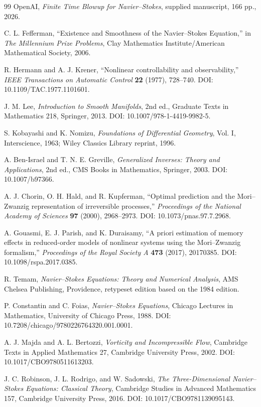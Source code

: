 \documentclass[12pt]{article}
\begin{document}
\begin{thebibliography}{99}
OpenAI, \emph{Finite Time Blowup for Navier--Stokes}, supplied manuscript, 166 pp., 2026.

C. L. Fefferman, ``Existence and Smoothness of the Navier--Stokes Equation,'' in \emph{The Millennium Prize Problems}, Clay Mathematics Institute/American Mathematical Society, 2006.

R. Hermann and A. J. Krener, ``Nonlinear controllability and observability,'' \emph{IEEE Transactions on Automatic Control} \textbf{22} (1977), 728--740. DOI: 10.1109/TAC.1977.1101601.

J. M. Lee, \emph{Introduction to Smooth Manifolds}, 2nd ed., Graduate Texts in Mathematics 218, Springer, 2013. DOI: 10.1007/978-1-4419-9982-5.

S. Kobayashi and K. Nomizu, \emph{Foundations of Differential Geometry}, Vol. I, Interscience, 1963; Wiley Classics Library reprint, 1996.

A. Ben-Israel and T. N. E. Greville, \emph{Generalized Inverses: Theory and Applications}, 2nd ed., CMS Books in Mathematics, Springer, 2003. DOI: 10.1007/b97366.

A. J. Chorin, O. H. Hald, and R. Kupferman, ``Optimal prediction and the Mori--Zwanzig representation of irreversible processes,'' \emph{Proceedings of the National Academy of Sciences} \textbf{97} (2000), 2968--2973. DOI: 10.1073/pnas.97.7.2968.

A. Gouasmi, E. J. Parish, and K. Duraisamy, ``A priori estimation of memory effects in reduced-order models of nonlinear systems using the Mori--Zwanzig formalism,'' \emph{Proceedings of the Royal Society A} \textbf{473} (2017), 20170385. DOI: 10.1098/rspa.2017.0385.

R. Temam, \emph{Navier--Stokes Equations: Theory and Numerical Analysis}, AMS Chelsea Publishing, Providence, retypeset edition based on the 1984 edition.

P. Constantin and C. Foias, \emph{Navier--Stokes Equations}, Chicago Lectures in Mathematics, University of Chicago Press, 1988. DOI: 10.7208/chicago/9780226764320.001.0001.

A. J. Majda and A. L. Bertozzi, \emph{Vorticity and Incompressible Flow}, Cambridge Texts in Applied Mathematics 27, Cambridge University Press, 2002. DOI: 10.1017/CBO9780511613203.

J. C. Robinson, J. L. Rodrigo, and W. Sadowski, \emph{The Three-Dimensional Navier--Stokes Equations: Classical Theory}, Cambridge Studies in Advanced Mathematics 157, Cambridge University Press, 2016. DOI: 10.1017/CBO9781139095143.
\end{thebibliography}
\end{document}
